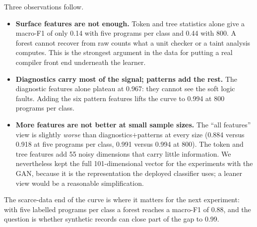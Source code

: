 \documentclass[conference]{IEEEtran}
\begin{document}
\begin{table}[t]
\centering
\caption{Test macro-F1 by feature view and number of training programs per class.}
\label{tab:learning}
\footnotesize
{}
\end{table}

Three observations follow.

\begin{itemize}
    \item \textbf{Surface features are not enough.} Token and tree statistics alone give a macro-F1 of only 0.14 with five
    programs per class and 0.44 with 800. A forest cannot recover from raw counts what a unit checker or a taint analysis
    computes. This is the strongest argument in the data for putting a real compiler front end underneath the learner.
    \item \textbf{Diagnostics carry most of the signal; patterns add the rest.} The diagnostic features alone plateau at
    0.967: they cannot see the soft logic faults. Adding the six pattern features lifts the curve to 0.994 at 800 programs per
    class.
    \item \textbf{More features are not better at small sample sizes.} The ``all features'' view is slightly \emph{worse}
    than diagnostics$+$patterns at every size (0.884 versus 0.918 at five programs per class, 0.991 versus 0.994 at 800). The
    token and tree features add 55 noisy dimensions that carry little information. We nevertheless kept the full 101-dimensional
    vector for the experiments with the GAN, because it is the representation the deployed classifier uses; a leaner view would be
    a reasonable simplification.
\end{itemize}

The scarce-data end of the curve is where it matters for the next experiment: with five labelled programs per class a forest
reaches a macro-F1 of 0.88, and the question is whether synthetic records can close part of the gap to 0.99.
\end{document}
